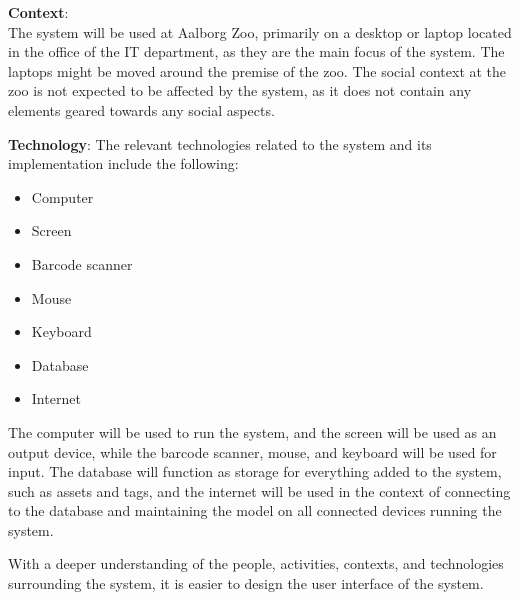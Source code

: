 \textbf{Context}: \\
The system will be used at Aalborg Zoo, primarily on a desktop or laptop located in the office of the IT department, as they are the main focus of the system. The laptops might be moved around the premise of the zoo. The social context at the zoo is not expected to be affected by the system, as it does not contain any elements geared towards any social aspects.
\par
 
\textbf{Technology}:
The relevant technologies related to the system and its implementation include the following:

\begin{itemize}
    \setlength\itemsep{0.05em}
    \item Computer
    \item Screen
    \item Barcode scanner
    \item Mouse
    \item Keyboard
    \item Database
    \item Internet
\end{itemize}

The computer will be used to run the system, and the screen will be used as an output device, while the barcode scanner, mouse, and keyboard will be used for input. The database will function as storage for everything added to the system, such as assets and tags, and the internet will be used in the context of connecting to the database and maintaining the model on all connected devices running the system.
\par
With a deeper understanding of the people, activities, contexts, and technologies surrounding the system, it is easier to design the user interface of the system.